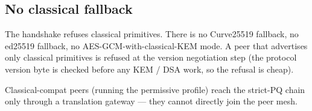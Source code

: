 \subsection{No classical fallback}

The handshake refuses classical primitives. There is no Curve25519
fallback, no ed25519 fallback, no AES-GCM-with-classical-KEM mode. A peer
that advertises only classical primitives is refused at the version
negotiation step (the protocol version byte is checked before any KEM /
DSA work, so the refusal is cheap).

Classical-compat peers (running the permissive profile) reach the strict-PQ
chain only through a translation gateway --- they cannot directly join the
peer mesh.
